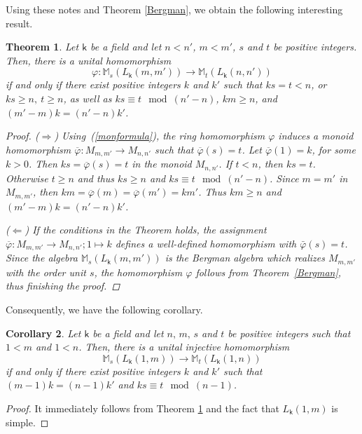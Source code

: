 \documentclass[a4paper, 11pt, reqno]{amsart}
\newtheorem{thm}{Theorem}[section]
\newtheorem{cor}[thm]{Corollary}
\theoremstyle{definition}
\let\phi\varphi
\def\M{\mathbb{M}}
\newcommand{\K}{\mathsf{k}}
\begin{document}
Using these notes and Theorem \ref{Bergman}, we obtain the following interesting result.

\begin{thm}\label{LAlg-Embed}
Let $\K$ be a field and let $n <  n'$, $m< m'$, $s$ and $t$ be positive integers. Then, there is a unital homomorphism \[\phi: \M_s(L_{\K}(m,m')) \longrightarrow \M_t(L_{\K}(n,n'))\] if and only if there exist positive integers $k$ and $k'$ such that 
$ks=t<n$, or
$ks\ge n,\ t\ge n$, as well as  $ks\equiv t \mod(n'-n)$, 
 \(km\ge n\), and \( (m' - m)k = (n' - n)k'\).

\begin{proof}
($\Longrightarrow$) 
Using~(\ref{monformula}), the ring homomorphism $\phi$ induces a monoid homomorphism
\(\overline \varphi:M_{m,m'}\to M_{n,n'}\) such that $\overline \phi(s)=t$. Let $\overline \phi(1)=k$, for some \(k> 0\).
Then
$ks=\overline \varphi(s)=t$ in the monoid $M_{n,n'}$. If $t<n$, then $ks=t$. Otherwise $t\geq n$ and thus $ks\ge n$ and 
$ks\equiv t \mod(n'-n)$. Since $m=m'$ in $M_{m,m'}$, then $km=\overline\phi(m)=\overline\phi(m')=km'$. Thus $km\geq n$ and $(m' - m)k = (n' - n)k'$.

($\Longleftarrow$) If the conditions in the Theorem holds, the assignment
$\overline \varphi:M_{m,m'}\to M_{n,n'}; 1\mapsto k$ defines a well-defined homomorphism with
\(\bar \varphi(s)=t\). Since the algebra $\M_s(L_\K(m,m'))$ is the Bergman algebra which realizes $M_{m,m'}$ with the order unit $s$,  
the homomorphism $\phi$ follows from
Theorem~\ref{Bergman}, thus finishing the proof.
\end{proof}    
\end{thm}

Consequently, we have the following corollary.

\begin{cor}\label{LAlg-Embed1}
Let $\K$ be a field and let $n,\, m,\, s$ and $t$ be positive integers such that $1 < m$ and $1 < n$. Then, there is a unital injective homomorphism \[\M_s(L_{\K}(1, m)) \longrightarrow \M_t(L_{\K}(1, n))\] if and only if there exist positive integers $k$ and $k'$ such that $(m - 1)k = (n - 1)k'$ and $ks \equiv t \mod{(n - 1)}$.
\end{cor}
\begin{proof}
It immediately follows from Theorem \ref{LAlg-Embed} and the fact that $L_{\K}(1, m)$ is simple.
\end{proof}
\end{document}
